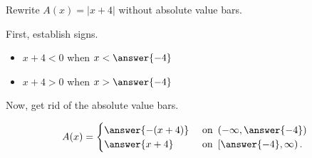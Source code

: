 \documentclass{ximera}
\author{Lee Wayand}
\begin{document}
\begin{example}











Rewrite $A(x) = | x + 4 |$ without absolute value bars.



\begin{explanation}


First, establish signs.

\begin{itemize}
\item $x + 4 < 0$ when $x < \answer{-4}$
\item $x + 4 > 0$ when $x > \answer{-4}$
\end{itemize}





Now, get rid of the absolute value bars.

\[
A(x) = 
\begin{cases}
  \answer{-(x + 4)} & \text{ on } \left( -\infty, \answer{-4} \right)   \\
  \answer{x + 4}  & \text{ on } \left[ \answer{-4}, \infty \right).
\end{cases}
\]






\end{explanation}






\end{example}
\end{document}
